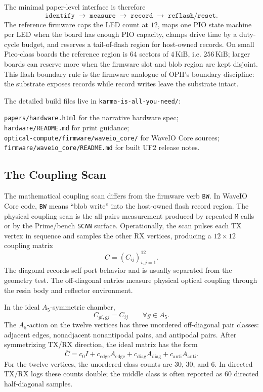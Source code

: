\documentclass[11pt]{article}
\theoremstyle{remark}
\theoremstyle{plain}
\newcommand{\diag}{\mathrm{diag}}
\newcommand{\anti}{\mathrm{anti}}
\begin{document}
The minimal paper-level interface is therefore
\[
\boxed{
\texttt{identify}
\;\to\;
\texttt{measure}
\;\to\;
\texttt{record}
\;\to\;
\texttt{reflash/reset}.
}
\]
The reference firmware caps the LED count at \(12\), maps one PIO state machine per LED when the board has enough PIO capacity, clamps drive time by a duty-cycle budget, and reserves a tail-of-flash region for host-owned records. On small Pico-class boards the reference region is \(64\) sectors of \(4\,\mathrm{KiB}\), i.e. \(256\,\mathrm{KiB}\); larger boards can reserve more when the firmware slot and blob region are kept disjoint. This flash-boundary rule is the firmware analogue of OPH's boundary discipline: the substrate exposes records while record writes leave the substrate intact.

The detailed build files live in \texttt{karma-is-all-you-need/}:
\begin{flushleft}
\texttt{papers/hardware.html} for the narrative hardware spec;\\
\texttt{hardware/README.md} for print guidance;\\
\texttt{optical-compute/firmware/waveio\_core/} for WaveIO Core sources;\\
\texttt{firmware/waveio\_core/README.md} for built UF2 release notes.
\end{flushleft}

\subsection{The Coupling Scan}

The mathematical coupling scan differs from the firmware verb \texttt{BW}. In WaveIO Core code, \texttt{BW} means ``blob write'' into the host-owned flash record region. The physical coupling scan is the all-pairs measurement produced by repeated \texttt{M} calls or by the Prime/bench \texttt{SCAN} surface. Operationally, the scan pulses each TX vertex in sequence and samples the other RX vertices, producing a \(12\times12\) coupling matrix
\[
C=(C_{ij})_{i,j=1}^{12}.
\]
The diagonal records self-port behavior and is usually separated from the geometry test. The off-diagonal entries measure physical optical coupling through the resin body and reflector environment.

In the ideal \(A_5\)-symmetric chamber,
\[
C_{g i,g j}=C_{ij}
\qquad
\forall g\in A_5.
\]
The \(A_5\)-action on the twelve vertices has three unordered off-diagonal pair classes: adjacent edges, nonadjacent nonantipodal pairs, and antipodal pairs. After symmetrizing TX/RX direction, the ideal matrix has the form
\[
\overline C
=
c_0 I+c_{\mathrm{edge}}A_{\mathrm{edge}}
+c_{\diag}A_{\diag}
+c_{\anti}A_{\anti}.
\]
For the twelve vertices, the unordered class counts are \(30\), \(30\), and \(6\). In directed TX/RX logs these counts double; the middle class is often reported as \(60\) directed half-diagonal samples.
\end{document}
